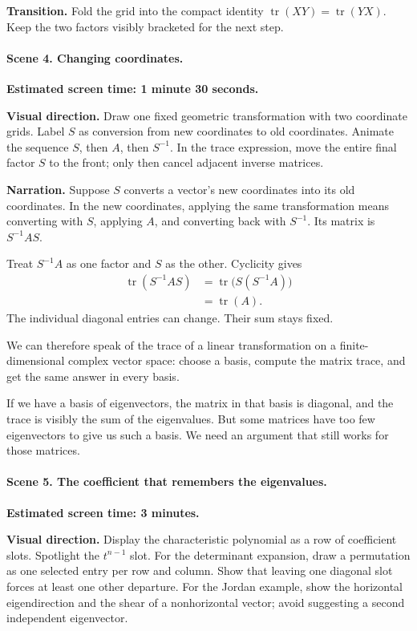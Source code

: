 \textbf{Transition.} Fold the grid into the compact identity $\operatorname{tr}(XY)=\operatorname{tr}(YX)$. Keep the two factors visibly bracketed for the next step.

\paragraph{Scene 4. Changing coordinates.}
\textbf{Estimated screen time: 1 minute 30 seconds.}

\textbf{Visual direction.} Draw one fixed geometric transformation with two coordinate grids. Label $S$ as conversion from new coordinates to old coordinates. Animate the sequence $S$, then $A$, then $S^{-1}$. In the trace expression, move the entire final factor $S$ to the front; only then cancel adjacent inverse matrices.

\textbf{Narration.} Suppose $S$ converts a vector's new coordinates into its old coordinates. In the new coordinates, applying the same transformation means converting with $S$, applying $A$, and converting back with $S^{-1}$. Its matrix is $S^{-1}AS$.

Treat $S^{-1}A$ as one factor and $S$ as the other. Cyclicity gives
\[
\begin{aligned}
\operatorname{tr}(S^{-1}AS)
&=\operatorname{tr}\bigl(S(S^{-1}A)\bigr)\\
&=\operatorname{tr}(A).
\end{aligned}
\]
The individual diagonal entries can change. Their sum stays fixed.

We can therefore speak of the trace of a linear transformation on a finite-dimensional complex vector space: choose a basis, compute the matrix trace, and get the same answer in every basis.

If we have a basis of eigenvectors, the matrix in that basis is diagonal, and the trace is visibly the sum of the eigenvalues. But some matrices have too few eigenvectors to give us such a basis. We need an argument that still works for those matrices.

\paragraph{Scene 5. The coefficient that remembers the eigenvalues.}
\textbf{Estimated screen time: 3 minutes.}

\textbf{Visual direction.} Display the characteristic polynomial as a row of coefficient slots. Spotlight the $t^{n-1}$ slot. For the determinant expansion, draw a permutation as one selected entry per row and column. Show that leaving one diagonal slot forces at least one other departure. For the Jordan example, show the horizontal eigendirection and the shear of a nonhorizontal vector; avoid suggesting a second independent eigenvector.


